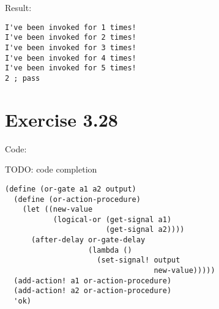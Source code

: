 \documentclass[../main.tex]{subfiles}
\begin{document}
Result:

\begin{lstlisting}
I've been invoked for 1 times!
I've been invoked for 2 times!
I've been invoked for 3 times!
I've been invoked for 4 times!
I've been invoked for 5 times!
2 ; pass
\end{lstlisting}

\section{Exercise 3.28}

Code:

TODO: code completion

\begin{lstlisting}
(define (or-gate a1 a2 output)
  (define (or-action-procedure)
    (let ((new-value
           (logical-or (get-signal a1)
                       (get-signal a2))))
      (after-delay or-gate-delay
                   (lambda ()
                     (set-signal! output
                                  new-value)))))
  (add-action! a1 or-action-procedure)
  (add-action! a2 or-action-procedure)
  'ok)
\end{lstlisting}
\end{document}
